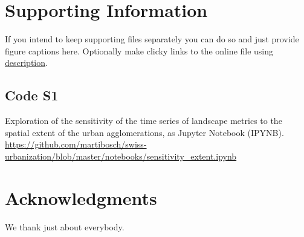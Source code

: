 \documentclass[10pt,letterpaper]{article}
\begin{document}

\section*{Supporting Information}
If you intend to keep supporting files separately you can do so and just provide figure captions here. Optionally make clicky links to the online file using \href{url}{description}.

\setcounter{figure}{0}
\renewcommand{\thefigure}{S\arabic{figure}}

\subsection*{Code S1}
\label{code-sensitivity}
Exploration of the sensitivity of the time series of landscape metrics to the spatial extent of the urban agglomerations, as Jupyter Notebook (IPYNB).
\url{https://github.com/martibosch/swiss-urbanization/blob/master/notebooks/sensitivity_extent.ipynb}



\section*{Acknowledgments}
We thank just about everybody.

\nolinenumbers




\end{document}
